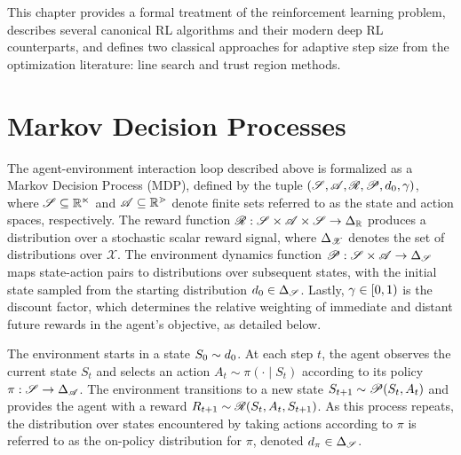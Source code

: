 This chapter provides a formal treatment of the reinforcement learning problem, describes several canonical RL algorithms and their modern deep RL counterparts, and defines two classical approaches for adaptive step size from the optimization literature: line search and trust region methods.

\section{Markov Decision Processes}
The agent-environment interaction loop described above is formalized as a Markov Decision Process (MDP), defined by the tuple $(\mathscr{S}, \mathscr{A}, \mathscr{R}, \mathscr{P}, d_{0}, \gamma)$, where $\mathscr{S} \subseteq \mathbb{R^n}$ and $\mathscr{A} \subseteq \mathbb{R^m}$ denote finite sets referred to as the state and action spaces, respectively. The reward function
$\mathscr{R}: \mathscr{S} \times \mathscr{A} \times \mathscr{S} \to \Delta_{\mathbb{R}}$ produces a distribution over a stochastic scalar reward signal, where $\Delta_{\mathscr{X}}$ denotes
the set of distributions over $\mathscr{X}$. The environment dynamics function $\mathscr{P}: \mathscr{S} \times \mathscr{A} \to \Delta_{\mathscr{S}}$
maps state-action pairs to distributions over subsequent states, with the initial state sampled from the starting distribution
$d_{0} \in \Delta_{\mathscr{S}}$. Lastly, $\gamma \in [0, 1)$ is the discount factor, which determines the relative weighting of immediate and distant future rewards in the agent's objective, as detailed below. 

The environment starts in a state $S_0 \sim d_{0}$. At each step $t$, the agent observes
the current state $S_t$ and selects an action $A_t \sim \pi(\cdot \mid S_t)$ according to its policy $\pi:
\mathscr{S} \to \Delta_{\mathscr{A}}$. The environment transitions to a new state $S_{t + 1} \sim
\mathscr{P}(S_t, A_t)$ and provides the agent with a reward $R_{t+1} \sim \mathscr{R}(S_t, A_t, S_{t + 1})$. As this process repeats, the distribution over states encountered by taking actions according to $\pi$ is referred to as the on-policy distribution for $\pi$, denoted $d_{\pi} \in \Delta_{\mathscr{S}}$. 

